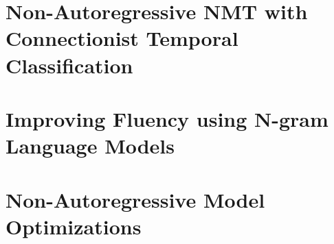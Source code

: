 \section{Non-Autoregressive NMT with Connectionist Temporal Classification}
\label{sec:nat-ctc}



\section{Improving Fluency using N-gram Language Models}
\label{sec:nat-lm}


\section{Non-Autoregressive Model Optimizations}
\label{sec:nat-opt}



